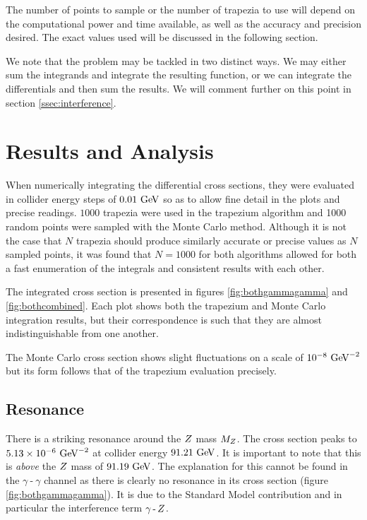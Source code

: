 \documentclass[]{article}
\providecommand{\e}[1]{\ensuremath{\times 10^{#1}}}
\begin{document}
The number of points to sample or the number of trapezia to use will depend on the computational power and time available, as well as the accuracy and precision desired. The exact values used will be discussed in the following section.

We note that the problem may be tackled in two distinct ways. We may either sum the integrands and integrate the resulting function, or we can integrate the differentials and then sum the results. We will comment further on this point in section \ref{ssec:interference}.


\section{Results and Analysis}\label{sec:results}

When numerically integrating the differential cross sections, they were evaluated in collider energy steps of $0.01\GeV$ so as to allow fine detail in the plots and precise readings. $1000$ trapezia were used in the trapezium algorithm and 1000 random points were sampled with the Monte Carlo method. Although it is not the case that $N$ trapezia should produce similarly accurate or precise values as $N$ sampled points, it was found that $N=1000$ for both algorithms allowed for both a fast enumeration of the integrals and consistent results with each other.

The integrated cross section is presented in figures \ref{fig:bothgammagamma} and \ref{fig:bothcombined}. Each plot shows both the trapezium and Monte Carlo integration results, but their correspondence is such that they are almost indistinguishable from one another.

The Monte Carlo cross section shows slight fluctuations on a scale of $10^{-8}\GeV^{-2}$ but its form follows that of the trapezium evaluation precisely.

\subsection{Resonance}\label{ssec:resonance}

There is a striking resonance around the $Z $ mass $M_{Z }$. The cross section peaks to $5.13\e{-6}\GeV^{-2}$ at collider energy $91.21\GeV$. It is important to note that this is \emph{above} the $Z $ mass of $91.19\GeV$. The explanation for this cannot be found in the $\gamma\operatorname{-}\gamma$ channel as there is clearly no resonance in its cross section (figure \ref{fig:bothgammagamma}). It is due to the Standard Model contribution and in particular the interference term $\gamma\operatorname{-}Z $.
\end{document}
